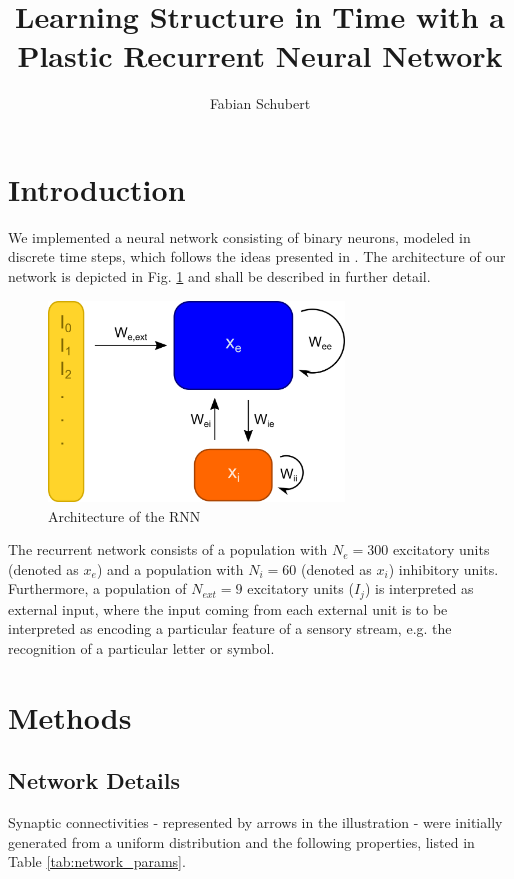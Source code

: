 \documentclass[10pt,a4paper]{article}
\title{Learning Structure in Time with a Plastic Recurrent Neural Network}
\author{Fabian Schubert}
\begin{document}
\maketitle
\section{Introduction}

We implemented a neural network consisting of binary neurons, modeled in discrete time steps, which follows the ideas presented in \cite{Duarte_2014}. The architecture of our network is depicted in Fig. \ref{fig:architecture} and shall be described in further detail.

\begin{figure}
\includegraphics[width=0.7\textwidth]{../plots/illustration.png}
\caption{\label{fig:architecture} Architecture of the RNN}
\end{figure}

The recurrent network consists of a population with $N_e = 300$ excitatory units (denoted as $x_e$) and a population with $N_i = 60$ (denoted as $x_i$) inhibitory units. Furthermore, a population of $N_{ext} = 9$ excitatory units ($I_j$) is interpreted as external input, where the input coming from each external unit is to be interpreted as encoding a particular feature of a sensory stream, e.g. the recognition of a particular letter or symbol.

\section{Methods}
\subsection{Network Details}

Synaptic connectivities - represented by arrows in the illustration - were initially generated from a uniform distribution and the following properties, listed in Table \ref{tab:network_params}.
\end{document}
